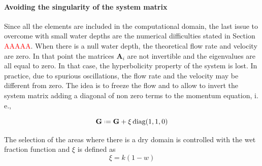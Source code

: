 



\paragraph{Avoiding the singularity of the system matrix}
Since all the elements are included in the computational domain, the last issue to overcome with small water depths are the numerical difficulties stated in Section \textcolor{red}{AAAAA}.
When there is a null water depth, the theoretical flow rate and velocity are zero. In that point the matrices $\mathbf{A}_i$ are not invertible and the eigenvalues are all equal to zero. In that case, the hyperbolicity property of the system is lost.
In practice, due to spurious oscillations, the flow rate and the velocity may be different from zero. The idea is to freeze the flow and to allow to invert the system matrix adding a diagonal of non zero terms to the momentum equation, i. e.,


\begin{equation}
\mathbf{G} \defeq \mathbf{G} + \xi\,\text{diag}(1, 1, 0)
\end{equation}


The selection of the areas where there is a dry domain is controlled with the wet fraction function and $\xi$ is defined as
\begin{equation}
\xi = k(1-w)
\end{equation}

